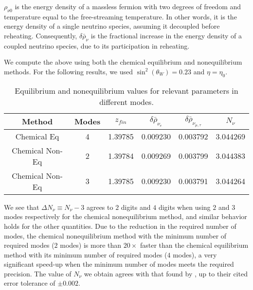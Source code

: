 $\rho_{\nu0}$ is the energy density of a massless fermion with two degrees of freedom and temperature equal to the free-streaming temperature.  In other words, it is the energy density of a single neutrino species, assuming it decoupled before reheating. Consequently, $\delta\bar\rho_\nu$ is the fractional increase in the energy density of a coupled neutrino species, due to its participation in reheating.

We compute the above using both the chemical equilibrium and nonequilibrium methods. For the following results, we used $\sin^2(\theta_W)=0.23$ and $\eta=\eta_0$. 
\begin{table}[ht]\label{table:method:comp}
\centering 
\begin{tabular}{|c|c|c|c|c|c|}
\hline
Method &Modes&$z_{fin}$ & $\delta\bar\rho_{\nu_e}$&   $\delta\bar\rho_{\nu_{\mu,\tau}}$ & $N_{\nu}$  \\
\hline
Chemical Eq& 4 &1.39785 &0.009230 &0.003792 &3.044269\\
\hline
Chemical Non-Eq& 2&1.39784 &0.009269 & 0.003799&3.044383 \\
\hline
Chemical Non-Eq& 3&1.39785&0.009230 & 0.003791&3.044264 \\
\hline
\end{tabular}
\caption{Equilibrium and nonequilibrium values for relevant parameters in different modes.}
\end{table}
We see that $\Delta N_\nu\equiv N_\nu-3$ agrees to $2$ digits and $4$ digits when using $2$ and $3$ modes respectively for the chemical nonequilibrium method, and similar behavior holds for the other quantities. Due to the reduction in the required number of modes, the chemical nonequilibrium method with the minimum number of required modes ($2$ modes) is more than $20\times$ faster than the chemical equilibrium method with its minimum number of required modes ($4$ modes), a very significant speed-up when the minimum number of modes meets the required precision.  The value of $N_\nu$ we obtain agrees with that found by \cite{Mangano:2005cc}, up to their cited error tolerance of $\pm 0.002$.

